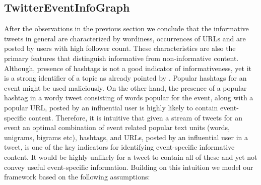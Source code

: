 
\subsection{TwitterEventInfoGraph\label{twitterEventInfoGraph}}
After the observations in the previous section we conclude that the informative tweets in general are characterized by wordiness, occurrences of URLs and are posted by users with high follower count. These characteristics are also the primary features that distinguish informative from non-informative content. Although, presence of hashtags is not a good indicator of informativeness, yet it is a strong identifier of a topic as already pointed by \cite{laniado2010making}. Popular hashtags for an event might be used maliciously. On the other hand, the presence of a popular hashtag in a wordy tweet consisting of words popular for the event, along with a popular URL, posted by an influential user is highly likely to contain event-specific content. Therefore, it is intuitive that given a stream of tweets for an event an optimal combination of event related popular text units (words, unigrams, bigrams etc),  hashtags, and URLs, posted by an influential user in a tweet, is one of the key indicators for identifying event-specific informative content. It would be highly unlikely for a tweet to contain all of these and yet not convey useful event-specific information. Building on this intuition we model our framework based on the following assumptions:

